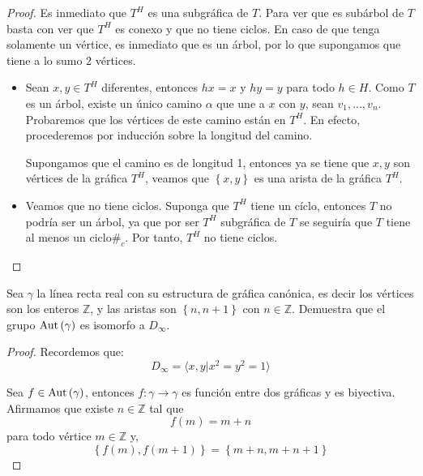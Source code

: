 \documentclass[12pt]{report}
\newcounter{it}
\theoremstyle{largebreak}
\newcommand\cf[3]{\ensuremath{#1:#2\rightarrow#3}}
\newcommand\contradiction{\ensuremath{\#_c}}
\newcommand{\Aut}[1]{\ensuremath{\textup{Aut}\left(#1\right)}}
\newcommand{\gen}[1]{\ensuremath{\langle#1\rangle}}
\begin{document}
    \begin{proof}
        Es inmediato que $T^H$ es una subgráfica de $T$. Para ver que es subárbol de $T$ basta con ver que $T^H$ es conexo y que no tiene ciclos. En caso de que tenga solamente un vértice, es inmediato que es un árbol, por lo que supongamos que tiene a lo sumo 2 vértices.
        \begin{itemize}
            \item Sean $x,y\in T^H$ diferentes, entonces $hx=x$ y $hy=y$ para todo $h\in H$. Como $T$ es un árbol, existe un único camino $\alpha$ que une a $x$ con $y$, sean $v_1,...,v_n$. Probaremos que los vértices de este camino están en $T^H$. En efecto, procederemos por inducción sobre la longitud del camino. 
            
            Supongamos que el camino es de longitud 1, entonces ya se tiene que $x,y$ son vértices de la gráfica $T^H$, veamos que $\left\{x,y \right\}$ es una arista de la gráfica $T^H$.

            \item Veamos que no tiene ciclos. Suponga que $T^H$ tiene un cíclo, entonces $T$ no podría ser un árbol, ya que por ser $T^H$ subgráfica de $T$ se seguiría que $T$ tiene al menos un ciclo\contradiction. Por tanto, $T^H$ no tiene ciclos.
        \end{itemize}
    \end{proof}

    \begin{excer}
        Sea $\gamma$ la línea recta real con su estructura de gráfica canónica, es decir los vértices son los enteros $\mathbb{Z}$, y las aristas son $\left\{n,n+1\right\}$ con $n\in\mathbb{Z}$. Demuestra que el grupo $\Aut{\gamma}$ es isomorfo a $D_\infty$.
    \end{excer}

    \begin{proof}
        Recordemos que:
        \begin{equation*}
            D_\infty=\gen{x,y\Big|x^2=y^2=1}
        \end{equation*}

        Sea $f\in\Aut{\gamma}$, entonces $\cf{f}{\gamma}{\gamma}$ es función entre dos gráficas y es biyectiva. Afirmamos que existe $n\in\mathbb{Z}$ tal que
        \begin{equation*}
            f(m)=m+n
        \end{equation*}
        para todo vértice $m\in\mathbb{Z}$ y,
        \begin{equation*}
            \left\{f(m),f(m+1) \right\}=\left\{m+n,m+n+1 \right\}
        \end{equation*}
    \end{proof}
\end{document}
